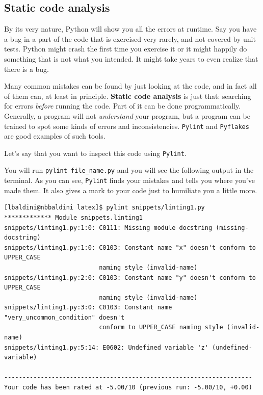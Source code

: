 \subsection{Static code analysis}
By its very nature, Python will show you all the errors at runtime. Say you have a bug in a part of the code that is exercised very rarely, and not covered by unit tests. Python might crash the first time you exercise it or it might happily do something that is not what you intended. It might take years to even realize that there is a bug.

Many common mistakes can be found by just looking at the code, and in fact all of them can, at least in principle. \textbf{Static code analysis} is just that: searching for errors \textit{before} running the code. Part of it can be done programmatically. Generally, a program will not \textit{understand} your program, but a program can be trained to spot some kinds of errors and inconsistencies. \texttt{Pylint} and \texttt{Pyflakes} are good examples of such tools. 

Let's say that you want to inspect this code using \texttt{Pylint}.



You will run \texttt{pylint file\_name.py} and you will see the following output in the terminal. As you can see, \texttt{Pylint} finds your mistakes and tells you where you've made them. It also gives a mark to your code just to humiliate you a little more.

{\scriptsize
\begin{verbatim}
[lbaldini@nbbaldini latex]$ pylint snippets/linting1.py 
************* Module snippets.linting1
snippets/linting1.py:1:0: C0111: Missing module docstring (missing-docstring)
snippets/linting1.py:1:0: C0103: Constant name "x" doesn't conform to UPPER_CASE
                          naming style (invalid-name)
snippets/linting1.py:2:0: C0103: Constant name "y" doesn't conform to UPPER_CASE
                          naming style (invalid-name)
snippets/linting1.py:3:0: C0103: Constant name "very_uncommon_condition" doesn't
                          conform to UPPER_CASE naming style (invalid-name)
snippets/linting1.py:5:14: E0602: Undefined variable 'z' (undefined-variable)

--------------------------------------------------------------------
Your code has been rated at -5.00/10 (previous run: -5.00/10, +0.00)
\end{verbatim}
}

